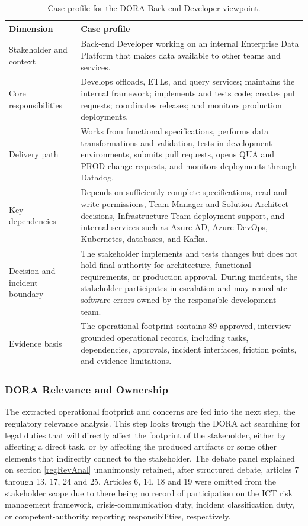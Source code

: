 \begin{table}[ht]
\centering
\small
\begin{tabular}{p{3.2cm} p{10.2cm}}
\hline
\textbf{Dimension} & \textbf{Case profile} \\
\hline
Stakeholder and context &
Back-end Developer working on an internal Enterprise Data Platform that makes data available to other teams and services. \\
\hline
Core responsibilities &
Develops offloads, ETLs, and query services; maintains the internal framework; implements and tests code; creates pull requests; coordinates releases; and monitors production deployments. \\
\hline
Delivery path &
Works from functional specifications, performs data transformations and validation, tests in development environments, submits pull requests, opens QUA and PROD change requests, and monitors deployments through Datadog. \\
\hline
Key dependencies &
Depends on sufficiently complete specifications, read and write permissions, Team Manager and Solution Architect decisions, Infrastructure Team deployment support, and internal services such as Azure AD, Azure DevOps, Kubernetes, databases, and Kafka. \\
\hline
Decision and incident boundary &
The stakeholder implements and tests changes but does not hold final authority for architecture, functional requirements, or production approval. During incidents, the stakeholder participates in escalation and may remediate software errors owned by the responsible development team. \\
\hline
Evidence basis &
The operational footprint contains 89 approved, interview-grounded operational records, including tasks, dependencies, approvals, incident interfaces, friction points, and evidence limitations. \\
\hline
\end{tabular}
\caption{Case profile for the DORA Back-end Developer viewpoint.}
\label{tab:dora-backend-developer-profile}
\end{table}

\subsubsection{DORA Relevance and Ownership}

The extracted operational footprint and concerns are fed into the next step, the regulatory relevance analysis. This step looks trough the \ac{DORA} act searching for legal duties that will directly affect the footprint of the stakeholder, either by affecting a direct task, or by affecting the produced artifacts or some other elements that indirectly connect to the stakeholder.
The debate panel explained on section \ref{regRevAnal} unanimously retained, after structured debate, articles 7 through 13, 17, 24 and 25.
Articles 6, 14, 18 and 19 were omitted from the stakeholder scope due to there being no record of participation on the \ac{ICT} risk management framework, crisis-communication duty, incident classification duty, or competent-authority reporting responsibilities, respectively.

